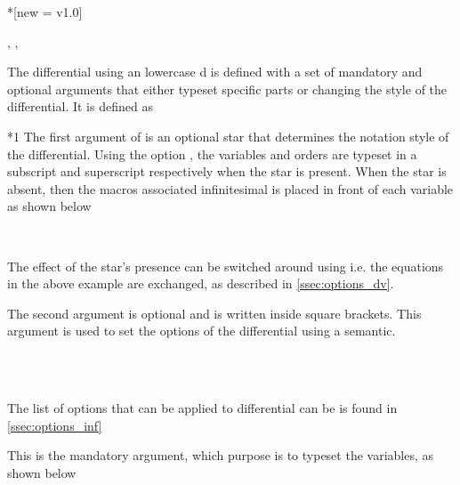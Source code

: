 	\begin{function}*{\odif}[new = v1.0]
		\begin{syntax}
			\sarg, , 
		\end{syntax}
		The differential  using an lowercase d is defined with a set of mandatory and optional arguments that either typeset specific parts or changing the style of the differential. It is defined as
		
		\begin{definition}
		\end{definition}
		
		\begin{argument}*{1}
			The first argument of  is an optional star that determines the notation style of the differential. Using the option , the variables and orders are typeset in a subscript and superscript respectively when the star is present. When the star is absent, then the macros associated infinitesimal is placed in front of each variable as shown below
			
			\begin{example}
				 \\
			\end{example}
			
			\noindent The effect of the star's presence can be switched around using  i.e. the equations in the above example are exchanged, as described in \cref{ssec:options_dv}.
		\end{argument}
		
		\begin{argument}{2}
			The second argument is optional and is written inside square brackets. This argument is used to set the options of the differential using a  semantic.
			
			\begin{example}
				\odif[order={n,3}]{x,y,z} \\
				\odif[sep-var-inf=0]{x,y,z} \\
				\odif*[sep-var-var=0]{x,y,z}
			\end{example}
			
			\noindent The list of options that can be applied to differential can be is found in \cref{ssec:options_inf}
		\end{argument}
		
		\begin{argument}{3}
			This is the mandatory argument, which purpose is to typeset the variables, as shown below
			
			\begin{example}
				\odif{x} \\
				\odif{s_1,s_2...,s_n}
			\end{example}
		\end{argument}
	\end{function}
	

